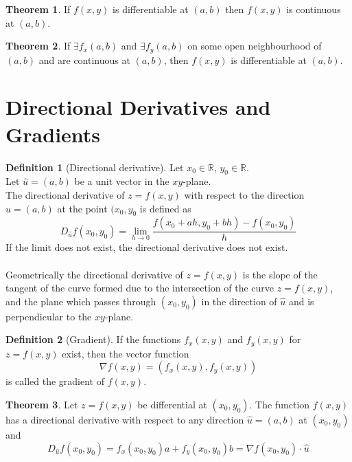 \documentclass[fleqn, a4paper, 12pt, twoside]{article}
\theoremstyle{definition}
\newtheorem{definition}{Definition}
\theoremstyle{theorem}
\newtheorem{theorem}{Theorem}
\begin{document}
{\begin{theorem}
	If $f(x,y)$ is differentiable at $(a,b)$ then $f(x,y)$ is continuous at $(a,b)$.
\end{theorem}

\begin{theorem}
	If $\exists f_x(a,b)$ and $\exists f_y(a,b)$ on some open neighbourhood of $(a,b)$ and are continuous at $(a,b)$, then $f(x,y)$ is differentiable at $(a,b)$.
\end{theorem}

\section{Directional Derivatives and Gradients}

\begin{definition}[Directional derivative]
	Let $x_0 \in \mathbb{R}$, $y_0 \in \mathbb{R}$.\\
	Let $\hat{u} = (a,b)$ be a unit vector in the $x y$-plane.\\
	The directional derivative of $z = f(x,y)$ with respect to the direction $\hat{u} = (a,b)$ at the point $(x_0,y_0$ is defined as
	\begin{equation*}
		D_{\hat{u}} f(x_0,y_0) = \lim\limits_{h \to 0} \frac{f(x_0 + a h, y_0 + b h) - f(x_0, y_0)}{h}
	\end{equation*}
	If the limit does not exist, the directional derivative does not exist.\\
	~\\
	Geometrically the directional derivative of $z = f(x,y)$ is the slope of the tangent of the curve formed due to the intersection of the curve $z = f(x,y)$, and the plane which passes through $(x_0,y_0)$ in the direction of $\hat{u}$ and is perpendicular to the $x y$-plane.
\end{definition}

\begin{definition}[Gradient]
	If the functions $f_x(x,y)$ and $f_y(x,y)$ for $z = f(x,y)$ exist, then the vector function
	\begin{equation*}
		\nabla f(x,y) = \left( f_x(x,y) , f_y(x,y) \right)
	\end{equation*}
	is called the gradient of $f(x,y)$.
\end{definition}

\begin{theorem}
	Let $z = f(x,y)$ be differential at $(x_0, y_0)$.
	The function $f(x,y)$ has a directional derivative with respect to any direction $\hat{u} = (a,b)$ at $(x_0, y_0)$ and
	\begin{equation*}
		D_{\hat{u}} f(x_0, y_0) = f_x(x_0, y_0) a + f_y(x_0, y_0) b = \nabla f(x_0, y_0) \cdot \hat{u}
	\end{equation*}
\end{theorem}

}
\end{document}
